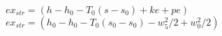 \( ex_{str} = (h - h_0 - T_0 (s - s_0) + ke + pe) \)  
\( ex_{str} = (h_0 - h_0 - T_0 (s_0 - s_0) - w_5^2 / 2 + w_0^2 / 2) \)